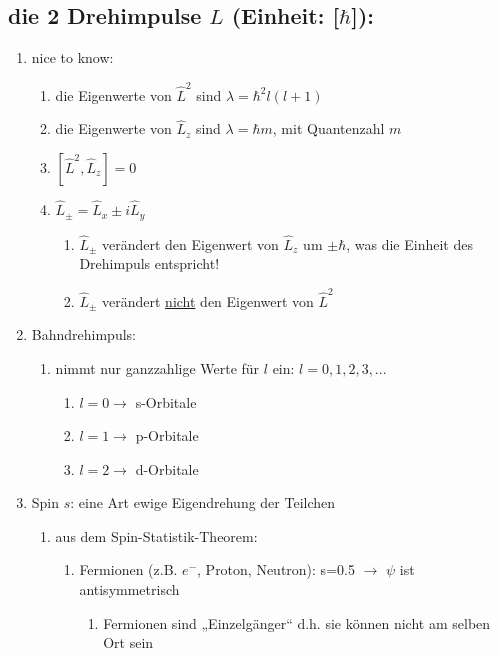 \subsection{die 2 Drehimpulse $L$ (\textbf{Einheit}: [$\hbar$]):} \label{Drehimpuls}
\begin{enumerate}
    \item nice to know:
    \begin{enumerate}
        \item die Eigenwerte von $\hat{L}^2$ sind $\lambda=\hbar^2 l (l+1)$
        \item die Eigenwerte von $\hat{L}_z$ sind $\lambda=\hbar m$, mit Quantenzahl $m$
        \item $[\hat{L}^2,\hat{L}_z]=0$
        \item $\hat{L}_\pm=\hat{L}_x \pm i\hat{L}_y$
        \begin{enumerate}
            \item $\hat{L}_\pm$ verändert den Eigenwert von $\hat{L}_z$ um $\pm \hbar$, was die Einheit des Drehimpuls entspricht!
            \item $\hat{L}_\pm$ verändert \underline{nicht} den Eigenwert von $\hat{L}^2$
        \end{enumerate}
    \end{enumerate}
    \item Bahndrehimpuls:
    \begin{enumerate}
        \item nimmt nur ganzzahlige Werte für $l$ ein: $l=0,1,2,3,...$
        \begin{enumerate}
            \item $l=0\rightarrow$ s-Orbitale
            \item $l=1\rightarrow$ p-Orbitale
            \item $l=2\rightarrow$ d-Orbitale
        \end{enumerate}
    \end{enumerate}
    \item Spin $s$: eine Art ewige Eigendrehung der Teilchen
\begin{enumerate}
    \item aus dem Spin-Statistik-Theorem:
\begin{enumerate}
    \item Fermionen (z.B. $e^-$, Proton, Neutron): s=0.5  $\rightarrow$ $\psi$ ist antisymmetrisch
    \begin{enumerate}
        \item Fermionen sind „Einzelgänger“ d.h. sie können nicht am selben Ort sein

\end{enumerate}
\end{enumerate}
\end{enumerate}
\end{enumerate}
